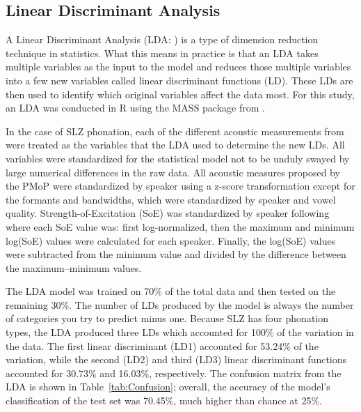 \documentclass[12pt, letterpaper]{article}
\begin{document}
\subsection{Linear Discriminant Analysis} \label{sec:LDAResults}

A Linear Discriminant Analysis (LDA: \cite{fisherUseMultipleMeasurements1936}) is a type of dimension reduction technique in statistics. What this means in practice is that an LDA takes multiple variables as the input to the model and reduces those multiple variables into a few new variables called linear discriminant functions (LD). These LDs are then used to identify which original variables affect the data most. For this study, an LDA was conducted in R \citep{rcoreteamLanguageEnvironmentStatistical2021} using the MASS package from \citet{venablesModernAppliedStatistics2002}.

In the case of SLZ phonation, each of the different acoustic measurements from  were treated as the variables that the LDA used to determine the new LDs. All variables were standardized for the statistical model not to be unduly swayed by large numerical differences in the raw data. All acoustic measures proposed by the PMoP were standardized by speaker using a z-score transformation except for the formants and bandwidths, which were standardized by speaker and vowel quality. Strength-of-Excitation (SoE) was standardized by speaker following \citet{garellekVoicingGlottalConsonants2021} where each SoE value was: first log-normalized, then the maximum and minimum log(SoE) values were calculated for each speaker. Finally, the log(SoE) values were subtracted from the minimum value and divided by the difference between the maximum–minimum values.

The LDA model was trained on 70\% of the total data and then tested on the remaining 30\%. The number of LDs produced by the model is always the number of categories you try to predict minus one. Because SLZ has four phonation types, the LDA produced three LDs which accounted for 100\% of the variation in the data. The first linear discriminant (LD1) accounted for 53.24\% of the variation, while the second (LD2) and third (LD3) linear discriminant functions accounted for 30.73\% and 16.03\%, respectively. The confusion matrix from the LDA is shown in Table~\ref{tab:Confusion}; overall, the accuracy of the model's classification of the test set was 70.45\%, much higher than chance at 25\%.
\end{document}
